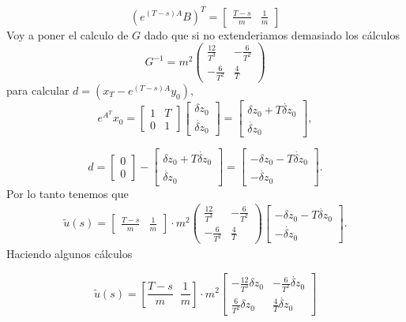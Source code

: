 \documentclass{uofa-eng-assignment}
\begin{document}
\[
 (e^{(T-s)A}B)^T= 
\begin{bmatrix}
  \frac{T-s}{m}  &
  \frac{1}{m}
\end{bmatrix}
\]
Voy a poner el calculo de $G$ dado que si no extenderiamos demasiado los cálculos 
\[
G^{-1} = m^2
\begin{pmatrix}
\frac{12}{T^3} & -\frac{6}{T^2} \\
-\frac{6}{T^2} & \frac{4}{T}
\end{pmatrix}
\]
para calcular $d = \left( x_T - e^{(T-s)A} y_0 \right),$
\[
e^{A^T} x_0 =
\begin{bmatrix}
1 & T \\
0 & 1
\end{bmatrix}
\begin{bmatrix}
\delta z_0 \\
\dot{\delta z}_0
\end{bmatrix}
=
\begin{bmatrix}
\delta z_0 + T \dot{\delta z}_0 \\
\dot{\delta z}_0
\end{bmatrix},
\]

\[
d =
\begin{bmatrix}
0 \\
0
\end{bmatrix}
-
\begin{bmatrix}
\delta z_0 + T \dot{\delta z}_0 \\
\dot{\delta z}_0
\end{bmatrix}
=
\begin{bmatrix}
- \delta z_0 - T \dot{\delta z}_0 \\
- \dot{\delta z}_0
\end{bmatrix}.
\]
Por lo tanto tenemos que 
\begin{align*}
    \tilde{u}(s)= \begin{bmatrix}
  \frac{T-s}{m}  &
  \frac{1}{m}
\end{bmatrix} \cdot m^2\begin{pmatrix}
\frac{12}{T^3} & -\frac{6}{T^2} \\
-\frac{6}{T^2} & \frac{4}{T}
\end{pmatrix}\begin{bmatrix}
- \delta z_0 - T \dot{\delta z}_0 \\
- \dot{\delta z}_0
\end{bmatrix}.
\end{align*}
Haciendo algunos cálculos

\[
\tilde{u}(s) = 
\left[ \frac{T - s}{m} \;\; \frac{1}{m} \right] 
\cdot m^2
\begin{bmatrix}
-\frac{12}{T^3} \delta z_0 & -\frac{6}{T^2} \dot{\delta z}_0 \\
\frac{6}{T^2} \delta z_0 & \frac{4}{T} \dot{\delta z}_0
\end{bmatrix}
\]
\end{document}
